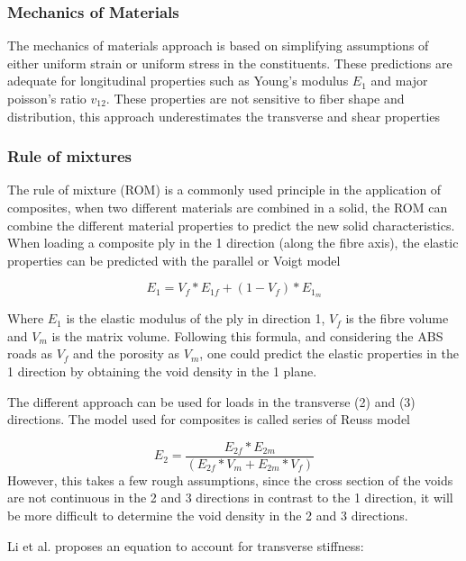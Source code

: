 \subsubsection{Mechanics of Materials}
The mechanics of materials approach is based on simplifying assumptions of either uniform strain or uniform stress in the constituents. These predictions are adequate for longitudinal properties such as Young's modulus $E_1$ and major poisson's ratio $v_{12}$. These properties are not sensitive to fiber shape and distribution, this approach underestimates the transverse and shear properties\cite{Daniel2006EngineeringMaterials}

\subsubsection{Rule of mixtures}
The rule of mixture (ROM) is a commonly used principle in the application of composites, when two different materials are combined in a solid, the ROM can combine the different material properties to predict the new solid characteristics. When loading a composite ply in the 1 direction (along the fibre axis), the elastic properties can be predicted with the parallel or Voigt model\cite{Daniel2006EngineeringMaterials} 

\begin{equation} \label{eqn:Voigt}
E_1=V_f*E_{1f}+(1-V_f)*E_1_m
\end{equation}

Where $E_1$ is the elastic modulus of the ply in direction 1, $V_f$ is the fibre volume and $V_m$ is the matrix volume. Following this formula, and considering the ABS roads as $V_f$ and the porosity as $V_m$, one could predict the elastic properties in the 1 direction by obtaining the void density in the 1 plane.

The different approach can be used for loads in the transverse (2) and (3) directions. The model used for composites is called series of Reuss model \cite{Daniel2006EngineeringMaterials} 

\begin{equation} \label{eqn:Reuss}
E_2=\frac{E_{2f}*E_{2m}}{(E_{2f}*V_m+E_{2m}*V_f)}
\end{equation}
However, this takes a few rough assumptions, since the cross section of the voids are not continuous in the 2 and 3 directions in contrast to the 1 direction, it will be more difficult to determine the void density in the 2 and 3 directions. 

Li et al. \cite{Li2002CompositeProperties} proposes an equation to account for transverse stiffness:

